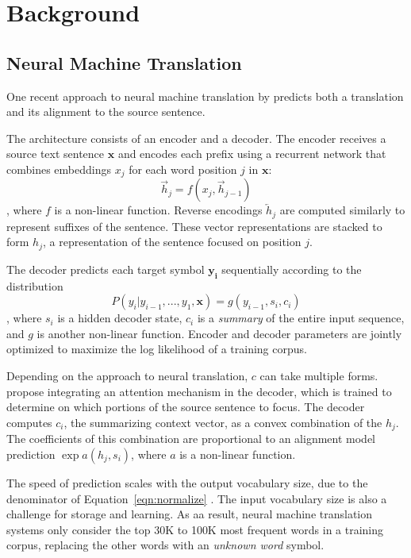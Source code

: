 \section{Background}
\label{sec:background}

\subsection{Neural Machine Translation}
One recent approach to neural machine translation by  predicts both a translation
and its alignment to the source sentence.

The architecture consists of an encoder and a decoder. The encoder receives a
source text sentence $\mathbf{x}$ and encodes each prefix using a recurrent
network that combines embeddings $x_j$ for each word position $j$ in
$\mathbf{x}$:
\begin{equation}
\overrightarrow{h}_{j} = f(x_{j}, \overrightarrow{h}_{j-1})
\end{equation},
where $f$ is a non-linear function. Reverse encodings $\overleftarrow{h}_j$
are computed similarly to represent suffixes of the sentence. These vector
representations are stacked to form $h_j$, a representation of the sentence
focused on position $j$.

The decoder predicts each target symbol $\mathbf{y_i}$ sequentially according
to the distribution
\begin{equation}
P(y_{i} | y_{i-1}, ..., y_{1}, \mathbf{x}) = g(y_{i-1}, s_i, c_i)
\label{eqn:normalize}
\end{equation},
where $s_i$ is a hidden decoder state, $c_i$ is a \emph{summary} of the entire
input sequence, and $g$ is another non-linear function. Encoder and decoder
parameters are jointly optimized to maximize the log likelihood of a training
corpus.

Depending on the approach to neural translation, $c$ can take multiple forms.
 propose integrating an attention mechanism
in the decoder, which is trained to determine on which portions of the source
sentence to focus. The decoder computes $c_{i}$, the summarizing context
vector, as a convex combination of the $h_{j}$. The coefficients of this
combination are proportional to an alignment model prediction $\exp a(h_j,
s_i)$, where $a$ is a non-linear function.

The speed of prediction scales with the output vocabulary size, due to the
denominator of Equation~\ref{eqn:normalize} \cite{journals/corr/JeanCMB14}. The
input vocabulary size is also a challenge for storage and learning. As aa
result, neural machine translation systems only consider the top 30K to 100K
most frequent words in a training corpus, replacing the other words with an
\emph{unknown word} symbol.

